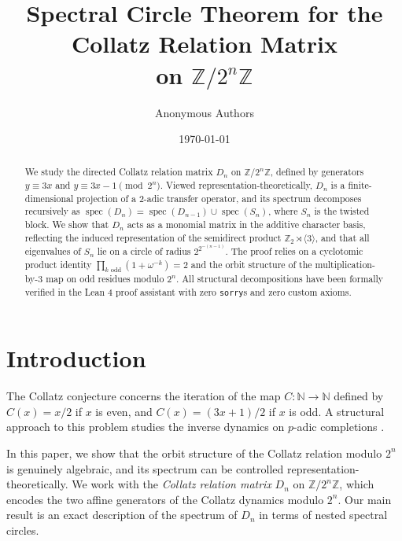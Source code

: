 \documentclass[11pt,reqno]{amsart}
\title{Spectral Circle Theorem for the Collatz Relation Matrix\\on $\mathbb{Z}/2^n\mathbb{Z}$}
\author{Anonymous Authors}
\date{\today}
\theoremstyle{definition}
\begin{document}
\begin{abstract}
We study the directed Collatz relation matrix $D_n$ on $\mathbb{Z}/2^n\mathbb{Z}$, defined by generators $y \equiv 3x$ and $y \equiv 3x - 1 \pmod{2^n}$. Viewed representation-theoretically, $D_n$ is a finite-dimensional projection of a 2-adic transfer operator, and its spectrum decomposes recursively as $\operatorname{spec}(D_n) = \operatorname{spec}(D_{n-1}) \cup \operatorname{spec}(S_n)$, where $S_n$ is the twisted block. We show that $D_n$ acts as a monomial matrix in the additive character basis, reflecting the induced representation of the semidirect product $\mathbb{Z}_2 \rtimes \langle 3 \rangle$, and that all eigenvalues of $S_n$ lie on a circle of radius $2^{2^{-(n-1)}}$. The proof relies on a cyclotomic product identity $\prod_{k \text{ odd}} (1 + \omega^{-k}) = 2$ and the orbit structure of the multiplication-by-3 map on odd residues modulo $2^n$. All structural decompositions have been formally verified in the Lean 4 proof assistant with zero \texttt{sorry}s and zero custom axioms.
\end{abstract}

\maketitle

\tableofcontents

\section{Introduction}

The Collatz conjecture concerns the iteration of the map $C \colon \mathbb{N} \to \mathbb{N}$ defined by $C(x) = x/2$ if $x$ is even, and $C(x) = (3x+1)/2$ if $x$ is odd. A structural approach to this problem studies the inverse dynamics on $p$-adic completions \cite{lagarias2010}.

In this paper, we show that the orbit structure of the Collatz relation modulo $2^n$ is genuinely algebraic, and its spectrum can be controlled representation-theoretically. We work with the \emph{Collatz relation matrix} $D_n$ on $\mathbb{Z}/2^n\mathbb{Z}$, which encodes the two affine generators of the Collatz dynamics modulo $2^n$. Our main result is an exact description of the spectrum of $D_n$ in terms of nested spectral circles.
\end{document}
